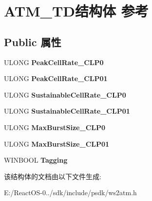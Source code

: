 \hypertarget{struct_a_t_m___t_d}{}\section{A\+T\+M\+\_\+\+T\+D结构体 参考}
\label{struct_a_t_m___t_d}
\subsection*{Public 属性}
\begin{DoxyCompactItemize}
\item 
\mbox{\label{struct_a_t_m___t_d_a39f9766b03f01ffa06a9a367e59a0cfe}} 
U\+L\+O\+NG {\bfseries Peak\+Cell\+Rate\+\_\+\+C\+L\+P0}
\item 
\mbox{\label{struct_a_t_m___t_d_a1b25525a7ed14ae28085c347d36c6710}} 
U\+L\+O\+NG {\bfseries Peak\+Cell\+Rate\+\_\+\+C\+L\+P01}
\item 
\mbox{\label{struct_a_t_m___t_d_a90855c053728045b189e69cbb28ecc34}} 
U\+L\+O\+NG {\bfseries Sustainable\+Cell\+Rate\+\_\+\+C\+L\+P0}
\item 
\mbox{\label{struct_a_t_m___t_d_a89704742bc6b3a96ac337b3d8d6acbc0}} 
U\+L\+O\+NG {\bfseries Sustainable\+Cell\+Rate\+\_\+\+C\+L\+P01}
\item 
\mbox{\label{struct_a_t_m___t_d_ad5b7dff5296ecd5caf1cdbbba0c79a17}} 
U\+L\+O\+NG {\bfseries Max\+Burst\+Size\+\_\+\+C\+L\+P0}
\item 
\mbox{\label{struct_a_t_m___t_d_a9e5181342b5a81325938418a43eb855a}} 
U\+L\+O\+NG {\bfseries Max\+Burst\+Size\+\_\+\+C\+L\+P01}
\item 
\mbox{\label{struct_a_t_m___t_d_ab95cb7f855e824b93b5b4b364ae0ca60}} 
W\+I\+N\+B\+O\+OL {\bfseries Tagging}
\end{DoxyCompactItemize}


该结构体的文档由以下文件生成\+:\begin{DoxyCompactItemize}
\item 
E\+:/\+React\+O\+S-\/0../sdk/include/psdk/ws2atm.\+h\end{DoxyCompactItemize}
